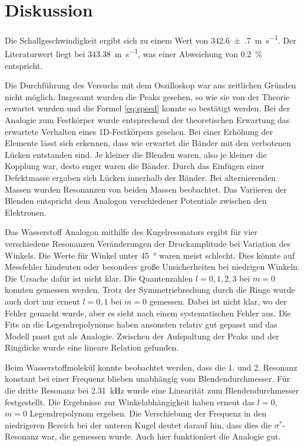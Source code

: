 \section{Diskussion}
\label{sec:Diskussion}

Die Schallgeschwindigkeit ergibt sich zu einem Wert von \SI{342.6(7)}{\meter\per\second}. Der Literaturwert liegt bei \SI{343.38}{\meter\per\second}, was einer Abweichung von \SI{0.2}{\percent} entspricht. 

Die Durchführung des Versuchs mit dem Oszilloskop war aus zeitlichen Gründen nicht möglich. 
Insgesamt wurden die Peaks gesehen, so wie sie von der Theorie erwartet wurden und die Formel \eqref{eq:speed} konnte so bestätigt werden. 
Bei der Analogie zum Festkörper wurde entsprechend der theoretischen Erwartung das erwartete Verhalten eines 1D-Festkörpers gesehen. Bei einer Erhöhung der Elemente lässt sich erkennen, dass wie erwartet die Bänder mit den verbotenen Lücken entstanden sind. Je kleiner die Blenden waren, also je kleiner die Kopplung war, desto enger waren die Bänder. 
Durch das Einfügen einer Defektmasse ergaben sich Lücken innerhalb der Bänder. 
Bei alternierenden Massen wurden Resonanzen von beiden Massen beobachtet.
Das Variieren der Blenden entspricht dem Analogon verschiedener Potentiale zwischen den Elektronen. 

Das Wasserstoff Analogon mithilfe des Kugelresonators ergibt für vier verschiedene Resonanzen Veränderungen der Druckamplitude bei Variation des Winkels. Die Werte für Winkel unter \SI{45}{\degree} waren meist schlecht. Dies könnte auf Messfehler hindeuten oder besonders große Unsicherheiten bei niedrigen Winkeln. Die Ursache dafür ist nicht klar. 
Die Quantenzahlen $l=0,1,2,3$ bei $m=0$ konnten gemessen werden. Trotz der Symmetriebrechung durch die Ringe wurde auch dort nur erneut $l=0, 1$ bei $m=0$ gemessen. Dabei ist nicht klar, wo der Fehler gemacht wurde, aber es sieht nach einem systematischen Fehler aus.  
Die Fits an die Legendrepolynome haben ansonsten relativ gut gepasst und das Modell passt gut als Analogie. 
Zwischen der Aufspaltung der Peaks und der Ringdicke wurde eine lineare Relation gefunden. 

Beim Wasserstoffmolekül konnte beobachtet werden, dass die 1. und 2. Resonanz konstant bei einer Frequenz blieben unabhängig vom Blendendurchmesser. 
Für die dritte Resonanz bei \SI{2.31}{\kilo\hertz} wurde eine Linearität zum Blendendurchmesser festgestellt.
Die Ergebnisse zur Winkelabhängigkeit haben erneut das $l=0$, $m=0$ Legendrepolynom ergeben. 
Die Verschiebung der Frequenz in den niedrigeren Bereich bei der unteren Kugel deutet darauf hin, dass dies die $\sigma^*$-Resonanz war, die gemessen wurde.
Auch hier funktioniert die Analogie gut. 

